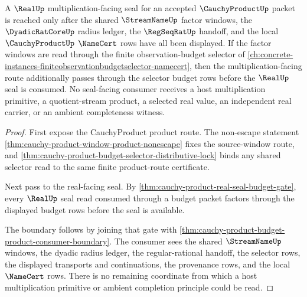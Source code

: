 \begin{theorem}
\label{thm:cauchy-product-real-budget-multiplication-boundary}
A $\RealUp$ multiplication-facing seal for an accepted $\CauchyProductUp$ packet is reached only after the shared $\StreamNameUp$ factor windows, the $\DyadicRatCoreUp$ radius ledger, the $\RegSeqRatUp$ handoff, and the local $\CauchyProductUp$ $\NameCert$ rows have all been displayed. If the factor windows are read through the finite observation-budget selector of \autoref{ch:concrete-instances-finiteobservationbudgetselector-namecert}, then the multiplication-facing route additionally passes through the selector budget rows before the $\RealUp$ seal is consumed. No seal-facing consumer receives a host multiplication primitive, a quotient-stream product, a selected real value, an independent real carrier, or an ambient completeness witness.
\end{theorem}
\begin{proof}
First expose the CauchyProduct product route. The non-escape statement \autoref{thm:cauchy-product-window-product-nonescape} fixes the source-window route, and \autoref{thm:cauchy-product-budget-selector-distributive-lock} binds any shared selector read to the same finite product-route certificate.

Next pass to the real-facing seal. By \autoref{thm:cauchy-product-real-seal-budget-gate}, every $\RealUp$ seal read consumed through a budget packet factors through the displayed budget rows before the seal is available.

The boundary follows by joining that gate with \autoref{thm:cauchy-product-budget-product-consumer-boundary}. The consumer sees the shared $\StreamNameUp$ windows, the dyadic radius ledger, the regular-rational handoff, the selector rows, the displayed transports and continuations, the provenance rows, and the local $\NameCert$ rows. There is no remaining coordinate from which a host multiplication primitive or ambient completion principle could be read.
\end{proof}

